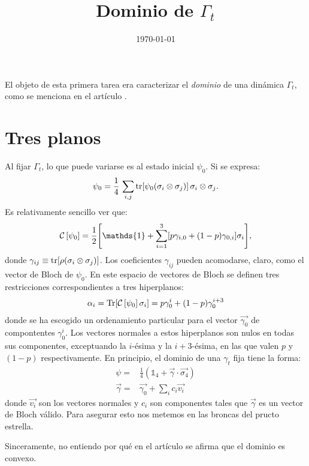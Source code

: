 \documentclass[onecolumn,11pt]{article}
\title{Dominio de $\Gamma_{t}$}
\date{\today}
\newcommand{\mcC}{\mathcal{C}}
\newcommand{\Id}{\mathds{1}}%
\newcommand{\CG}[1]{\mcC\left[#1\right]}
\begin{document}
\maketitle
\thispagestyle{empty}
El objeto de esta primera tarea era caracterizar el \textit{dominio} de una dinámica $\Gamma_{t}$, como se menciona en el artículo \cite{CGEmergingDynamics}.

\section{Tres planos}
Al fijar $\Gamma_{t}$, lo que puede variarse es al estado inicial $\psi_{0}$. Si se expresa:
\begin{equation}
    \psi_{0} = \frac{1}{4}\,\sum_{i,j} \tr[\psi_{0}(\sigma_i \otimes \sigma_j)]\, \sigma_i\otimes\sigma_j.
\end{equation}
Es relativamente sencillo ver que:
\begin{equation}
    \CG{\psi_{0}} = \frac{1}{2}\qty[\Id + \sum_{i=1}^3[p\gamma_{i,0}+(1-p)\gamma_{0,i}]\sigma_i],
\end{equation}
donde $\gamma_{ij} \equiv \tr[\rho(\sigma_i \otimes\sigma_j)]$. Los coeficientes $\gamma_{ij}$ pueden acomodarse, claro, como el vector de Bloch de $\psi_{0}$. En este espacio de vectores de Bloch se definen tres restricciones correspondientes a tres hiperplanos:
\begin{align}
\alpha_{i}=\Tr[\CG{\psi_{0}}\sigma_{i}]=p\gamma_{0}^{i}+(1-p)\gamma_{0}^{i+3}
\end{align}
donde se ha escogido un ordenamiento particular para el vector $\vec{\gamma_{0}}$ de compontentes $\gamma_{0}^{i}$. Los vectores normales a estos hiperplanos son nulos en todas sus componentes, exceptuando la $i$-ésima y la $i+3$-ésima, en las que valen $p$ y $(1-p)$ respectivamente. En principio, el dominio de una $\gamma_{t}$ fija tiene la forma:
\begin{align}
\psi=&\frac{1}{4}\left( \Id_{4}+\vec{\gamma}\cdot\vec{\sigma_{4}} \right)\\
\vec{\gamma}=&\vec{\gamma_{0}}+\sum_{i}c_{i}\vec{v_{i}}
\end{align}
donde $\vec{v_{i}}$ son los vectores normales y $c_{i}$ son componentes tales que $\vec{\gamma}$ es un vector de Bloch válido. Para asegurar esto nos metemos en las broncas del pructo estrella.

Sinceramente, no entiendo por qué en el artículo se afirma que el dominio es convexo.


\end{document}
